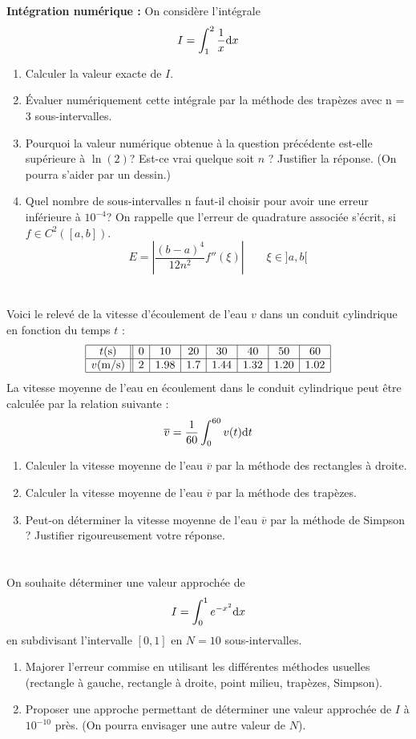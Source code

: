 \documentclass[a4paper]{article}
\def \de {{\rm d}}
\begin{document}
\section{} {\bf Intégration numérique : }
  On considère l'intégrale
\[ I = \int_1^2\frac 1x {\mbox d}x \]
\begin{enumerate}
\item  Calculer la valeur exacte de $I$.
\item  Évaluer numériquement cette intégrale par la méthode des trapèzes avec n = 3 sous-intervalles.
\item  Pourquoi la valeur numérique obtenue à la question précédente est-elle supérieure à $\ln(2)$? Est-ce vrai quelque soit $n$ ? Justifier la réponse. (On pourra s'aider par un dessin.)
\item  Quel nombre de sous-intervalles n faut-il choisir pour avoir une erreur inférieure à $10^{-4}$? On rappelle que l'erreur de quadrature associée s'écrit, si $f\in C^2([a,b])$.
\[ E =\left|\frac{(b-a)^4}{12 n^2} f''(\xi)\right| \qquad \xi \in  ]a,b[\]
\end{enumerate}

\section{}
Voici le relevé de la vitesse d'écoulement de l'eau $v$ dans
un conduit cylindrique en fonction du temps $t$ :
\[
\begin{array}{|c||c|c|c|c|c|c|c|}\hline
t \mbox{(s)} & 0 & 10 & 20 &30 &40 &50 &60\\ \hline
v \mbox{(m/s)} &2 &1.98 &1.7 &1.44 &1.32 &1.20 &1.02\\ \hline
\end{array}
\]
La vitesse moyenne de l'eau en écoulement dans le conduit cylindrique peut être calculée par la relation suivante :
\[\overline{v} =\frac 1{60}\int_0^{60}v(t)\de t\]
\begin{enumerate}
\item Calculer la vitesse moyenne de l'eau $\overline{v} $ par la méthode des rectangles à droite.
\item  Calculer la vitesse moyenne de l'eau $\overline{v} $ par la méthode des trapèzes.
\item Peut-on déterminer la vitesse moyenne de l'eau $\overline{v} $ par la méthode de Simpson ? Justifier rigoureusement votre réponse.
\end{enumerate}

\section{}
 On souhaite déterminer une valeur approchée de 
\[I =\int_0^1 e^{-x^2}\de x\]
 en subdivisant l'intervalle $[0, 1]$ en $N = 10$ sous-intervalles.
 \begin{enumerate}
\item  Majorer l'erreur commise en utilisant les différentes méthodes usuelles (rectangle à
gauche, rectangle à droite, point milieu, trapèzes, Simpson).
\item Proposer une approche permettant de déterminer une valeur approchée de $I$ à $10^{-10}$ près.
(On pourra envisager une autre valeur de $N$).
 \end{enumerate}
\end{document}
